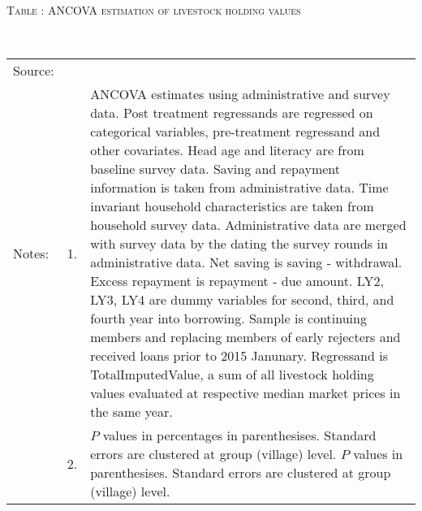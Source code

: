 \hspace{-1cm}\begin{minipage}[t]{14cm}
\hfil\textsc{\normalsize Table \thetable: ANCOVA estimation of livestock holding values\label{tab ANCOVA livestock}}\\
\setlength{\tabcolsep}{1pt}
\setlength{\baselineskip}{8pt}
\renewcommand{\arraystretch}{.55}
\hfil{}\\
\renewcommand{\arraystretch}{.8}
\setlength{\tabcolsep}{1pt}
\begin{tabular}{>{\hfill\scriptsize}p{1cm}<{}>{\hfill\scriptsize}p{.25cm}<{}>{\scriptsize}p{12cm}<{\hfill}}
Source:& \multicolumn{2}{l}{\scriptsize Estimated with GUK administrative and survey data.}\\
Notes: & 1. & ANCOVA estimates using administrative and survey data. Post treatment regressands are regressed on categorical variables, pre-treatment regressand and other covariates. Head age and literacy are from baseline survey data.  Saving and repayment information is taken from administrative data. Time invariant household characteristics are taken from household survey data. Administrative data are merged with survey data by the dating the survey rounds in administrative data. Net saving is saving - withdrawal. Excess repayment is repayment - due amount. \textsf{LY2, LY3, LY4} are dummy variables for second, third, and 	fourth year into borrowing. Sample is continuing members and replacing members of early rejecters and received loans prior to 2015 Janunary. Regressand is \textsf{TotalImputedValue}, a sum of all livestock holding values evaluated at respective median market prices in the same year. \\
& 2. & $P$ values in percentages in parenthesises. Standard errors are clustered at group (village) level.%
$P$ values in parenthesises. Standard errors are clustered at group (village) level.
\end{tabular}
\end{minipage}

